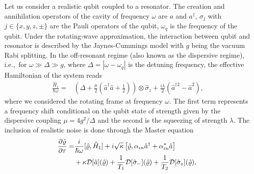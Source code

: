 \documentclass[%
reprint,
superscriptaddress,
nofootinbib,
 amsmath,amssymb,
prx,
floatfix,
]{revtex4-2}
\begin{document}
Let us consider a realistic qubit coupled to a resonator. The creation and annihilation operators of the cavity of frequency $\omega$ are $a$ and $a^\dag$, $\sigma_j$ with $j\in\{x,y,z,\pm\}$ are the Pauli operators of the qubit, $\omega_q$ is the frequency of the qubit. Under the rotating-wave approximation, the interaction between qubit and resonator is described by the Jaynes-Cummings model with $g$ being the vacuum Rabi splitting. %
In the off-resonant regime (also known as the dispersive regime), i.e.,~for $\omega \gg \Delta \gg g$, where $\Delta = |\omega - \omega_q|$ is the detuning frequency, the effective Hamiltonian of the system reads
\begin{align}
\label{eq:example_1_hamitonian}
    \frac{\hat{H}_1}{\hbar \omega}  =  &  \left(  \Delta + \frac{\mu}{2} \left( \hat{a}^\dag \hat{a} +\frac{1}{2} \right) \right) \otimes \hat{\sigma}_z  + \frac{i \lambda}{2} \left( \hat{a}^{\dag 2} - \hat{a}^2 \right),
\end{align} 
where we considered the rotating frame at frequency $\omega$. The first term represents a frequency shift conditional on the qubit state of strength given by the dispersive coupling $\mu = 4 g^2 / \Delta$ and the second is the squeezing of strength $\lambda$. %
The inclusion of realistic noise is done through the Master equation 
\begin{align}
\label{eq:example_1_master}
    \hspace{-0.1cm}\frac{\partial \hat{\varrho}}{\partial \tau} =&  \frac{i}{\hbar \omega} [ \hat{\varrho}, \hat{H}_1] +  i \sqrt{\kappa}  \left[ \hat{\varrho}, \alpha_{in} \hat{a}^{\dag} + \alpha^*_{in} \hat{a} \right]   \\&  \nonumber + \kappa \mathcal{D}[\hat{a}] (\hat{\varrho})  + \frac{1}{T_1}\mathcal{D}[\hat{\sigma}_-] (\hat{\varrho}) + \frac{1}{T_2}\mathcal{D}[\hat{\sigma}_z] (\hat{\varrho}) ,
\end{align}
\end{document}
